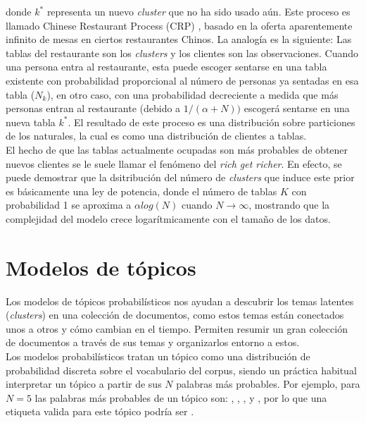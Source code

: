 \documentclass[letterpaper,12pt,oneside]{book} %
\begin{document}
donde $k^{*}$ representa un nuevo \textit{cluster} que no ha sido usado aún. Este proceso es llamado Chinese Restaurant Process (CRP) \citep{aldous1985exchangeability}, basado en la oferta aparentemente infinito de mesas en ciertos restaurantes Chinos. La analogía es la siguiente: Las tablas del restaurante son los \textit{clusters}  y los clientes son las observaciones. Cuando una persona entra al restaurante, esta puede escoger sentarse en una tabla existente con probabilidad proporcional al número de personas ya sentadas en esa tabla ($N_{k}$), en otro caso, con una probabilidad decreciente a medida que más personas entran al restaurante (debido a $1/(\alpha +N))$ escogerá sentarse en una nueva tabla $k^{*}$. El resultado de este proceso es una distribución sobre particiones de los naturales, la cual es como una distribución de clientes a tablas.\\

El hecho de que las tablas actualmente ocupadas son más probables de obtener nuevos clientes se le suele llamar el fenómeno del \textit{rich get richer}. En efecto, se puede demostrar que la dsitribución del número de \textit{clusters} que induce este prior es básicamente una ley de potencia, donde el número de tablas $K$ con probabilidad 1 se aproxima a $\alpha log(N)$ cuando $N\rightarrow \infty$, mostrando que la complejidad del modelo crece logarítmicamente con el tamaño de los datos.

\section{Modelos de tópicos}

Los modelos de tópicos probabilísticos nos ayudan a descubrir los temas latentes (\textit{clusters}) en una colección de documentos, como estos temas están conectados unos a otros y cómo cambian en el tiempo. Permiten resumir un gran colección de documentos a través de sus temas y organizarlos entorno a estos.\\

Los modelos probabilísticos tratan un tópico como una distribución de probabilidad discreta sobre el vocabulario del corpus, siendo un práctica habitual interpretar un tópico a partir de sus $N$ palabras más probables. Por ejemplo, para $N=5$ las palabras más probables de un tópico son: , , ,  y , por lo que una etiqueta valida para este tópico podría ser .\\ 
\end{document}
